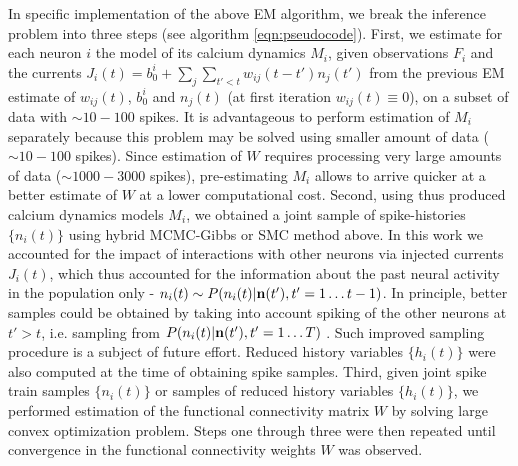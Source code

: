 In specific implementation of the above EM algorithm, we break the inference problem into three steps (see algorithm \ref{eqn:pseudocode}).  First, we estimate for each neuron $i$ the model of its calcium dynamics $M_i$, given observations $F_i$ and the currents $J_i(t)=b^i_0+\sum_{j}\sum_{t'<t}w_{ij}(t-t')n_{j}(t')$ from the previous EM estimate of $w_{ij}(t)$, $b^i_0$ and $n_{j}(t)$ (at first iteration $w_{ij}(t) \equiv 0$), on a subset of data with $\sim 10-100$ spikes.  It is advantageous to perform estimation of $M_i$ separately because this problem may be solved using smaller amount of data ($\sim 10-100$ spikes). Since estimation of $W$ requires processing very large amounts of data ($\sim 1000-3000$ spikes), pre-estimating $M_i$ allows to arrive quicker at a better estimate of $W$ at a lower computational cost.  Second, using thus produced calcium dynamics models $M_i$, we obtained a joint sample of spike-histories $\{ n_i(t)\}$ using hybrid MCMC-Gibbs or SMC method above.  In this work we accounted for the impact of interactions with other neurons via injected currents $J_i(t)$, which thus accounted for the information about the past neural activity in the population only - $n_i(t) \sim P(n_i(t)|{\bf n}(t'), {t'=1\ldots t-1})$. In principle, better samples could be obtained by taking into account spiking of the other neurons at $t'>t$, i.e. sampling from $P(n_i(t)|{\bf n}(t'), {t'=1\ldots T})$ \cite{PL07}. Such improved sampling procedure is a subject of future effort.  Reduced history variables $\{h_i(t)\}$ were also computed at the time of obtaining spike samples.  Third, given joint spike train samples $\{ n_i(t)\}$ or samples of reduced history variables $\{ h_i(t)\}$, we performed estimation of the functional connectivity matrix $W$ by solving large convex optimization problem.  Steps one through three were then repeated until convergence in the functional connectivity weights $W$ was observed.

